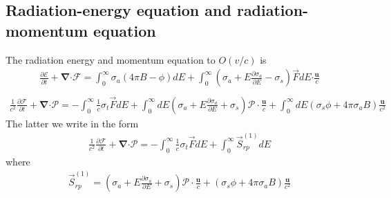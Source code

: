 \documentclass[10pt,letterpaper,notitlepage]{article}
\numberwithin{equation}{section}
\newcommand{\partialderiv}[2]{\frac{\partial #1}{\partial #2}}
\newcommand{\bnabla}{\boldsymbol{\nabla}}
\newcommand{\velocity}{\mathbf{u}}
\newcommand{\dotp}{\boldsymbol{\cdot}}
\newcommand{\RadE}{\mathcal{E}}
\newcommand{\RadF}{\boldsymbol{\mathcal{F}}}
\newcommand{\RadP}{\boldsymbol{\mathcal{P}}}
\renewcommand{\vec}[1]{\mbox{$\stackrel{\longrightarrow}{#1}$}}
\newcommand{\beqn}{\begin{equation}\begin{aligned}}
\newcommand{\eeqn}{\end{aligned}\end{equation}}
\begin{document}
\subsection{Radiation-energy equation and radiation-momentum equation}
The radiation energy and momentum equation to $O(v/c) $ is
\beqn
\frac{\partial \RadE}{\partial t}+\bnabla\dotp\RadF
=\int_0^{\infty} \sigma_a(4\pi B- \phi)dE 
+\int_0^{\infty}  (\sigma_a+E\frac{\partial \sigma_a}{\partial E}-\sigma_s)\vec{F} dE \dotp \frac{\velocity}{c}  \\
\eeqn
\beqn
\frac{1}{c^2}\partialderiv{\RadF}{t}+\bnabla \dotp \RadP =-\int_0^{\infty}\frac{1}{c}\sigma_t\vec{F} dE
+  \int_0^{\infty}dE(\sigma_a+E\frac{\partial \sigma_a}{\partial E}+\sigma_s)\RadP \cdot \frac{\velocity}{c}
+ \int_0^{\infty}dE (\sigma_s\phi   +4\pi\sigma_aB)\frac{\velocity}{c^2}
\eeqn
The latter we write in the form
\beqn \label{eq:radmom_weird}
\frac{1}{c^2}\partialderiv{\RadF}{t}+\bnabla \dotp \RadP =-\int_0^{\infty}\frac{1}{c}\sigma_t\vec{F} dE
+  \int_0^{\infty}\vec{S}_{rp}^{(1)}dE
\eeqn
where
\beqn 
\vec{S}_{rp}^{(1)} = (\sigma_a+E\frac{\partial \sigma_a}{\partial E}+\sigma_s)\RadP \cdot \frac{\velocity}{c}
+(\sigma_s\phi   +4\pi\sigma_aB)\frac{\velocity}{c^2}
\eeqn 
\end{document}
